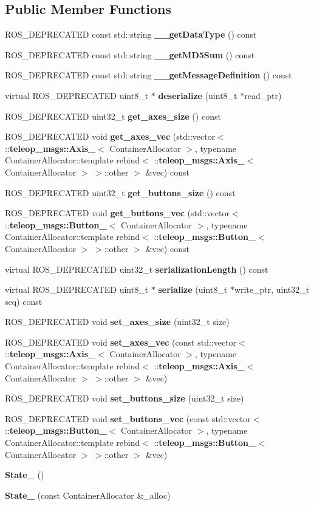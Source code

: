 \subsection*{Public Member Functions}
\begin{DoxyCompactItemize}
\item 
ROS\_\-DEPRECATED const std::string {\bf \_\-\_\-getDataType} () const 
\item 
ROS\_\-DEPRECATED const std::string {\bf \_\-\_\-getMD5Sum} () const 
\item 
ROS\_\-DEPRECATED const std::string {\bf \_\-\_\-getMessageDefinition} () const 
\item 
virtual ROS\_\-DEPRECATED uint8\_\-t $\ast$ {\bf deserialize} (uint8\_\-t $\ast$read\_\-ptr)
\item 
ROS\_\-DEPRECATED uint32\_\-t {\bf get\_\-axes\_\-size} () const 
\item 
ROS\_\-DEPRECATED void {\bf get\_\-axes\_\-vec} (std::vector$<$ ::{\bf teleop\_\-msgs::Axis\_\-}$<$ ContainerAllocator $>$, typename ContainerAllocator::template rebind$<$ ::{\bf teleop\_\-msgs::Axis\_\-}$<$ ContainerAllocator $>$ $>$::other $>$ \&vec) const 
\item 
ROS\_\-DEPRECATED uint32\_\-t {\bf get\_\-buttons\_\-size} () const 
\item 
ROS\_\-DEPRECATED void {\bf get\_\-buttons\_\-vec} (std::vector$<$ ::{\bf teleop\_\-msgs::Button\_\-}$<$ ContainerAllocator $>$, typename ContainerAllocator::template rebind$<$ ::{\bf teleop\_\-msgs::Button\_\-}$<$ ContainerAllocator $>$ $>$::other $>$ \&vec) const 
\item 
virtual ROS\_\-DEPRECATED uint32\_\-t {\bf serializationLength} () const 
\item 
virtual ROS\_\-DEPRECATED uint8\_\-t $\ast$ {\bf serialize} (uint8\_\-t $\ast$write\_\-ptr, uint32\_\-t seq) const 
\item 
ROS\_\-DEPRECATED void {\bf set\_\-axes\_\-size} (uint32\_\-t size)
\item 
ROS\_\-DEPRECATED void {\bf set\_\-axes\_\-vec} (const std::vector$<$ ::{\bf teleop\_\-msgs::Axis\_\-}$<$ ContainerAllocator $>$, typename ContainerAllocator::template rebind$<$ ::{\bf teleop\_\-msgs::Axis\_\-}$<$ ContainerAllocator $>$ $>$::other $>$ \&vec)
\item 
ROS\_\-DEPRECATED void {\bf set\_\-buttons\_\-size} (uint32\_\-t size)
\item 
ROS\_\-DEPRECATED void {\bf set\_\-buttons\_\-vec} (const std::vector$<$ ::{\bf teleop\_\-msgs::Button\_\-}$<$ ContainerAllocator $>$, typename ContainerAllocator::template rebind$<$ ::{\bf teleop\_\-msgs::Button\_\-}$<$ ContainerAllocator $>$ $>$::other $>$ \&vec)
\item 
{\bf State\_\-} ()
\item 
{\bf State\_\-} (const ContainerAllocator \&\_\-alloc)
\end{DoxyCompactItemize}
